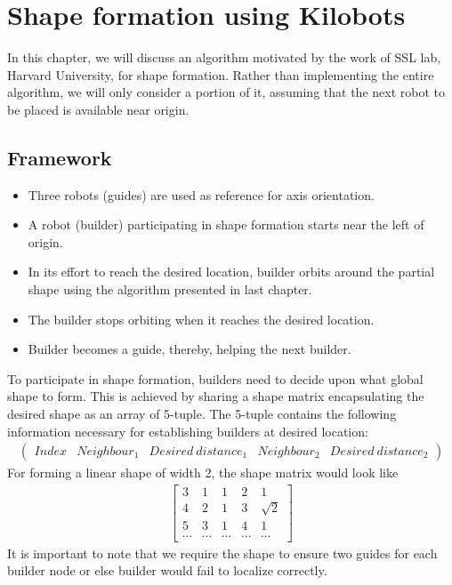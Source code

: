 \documentclass{report}[12pt]
\begin{document}
\chapter{Shape formation using Kilobots}
In this chapter, we will discuss an algorithm motivated by the work \cite{MR-AC-RN:2014} of SSL lab, Harvard University, for shape formation. Rather than implementing the entire algorithm, we will only consider a portion of it, assuming that the next robot to be placed is available near origin.
\section{Framework}
\begin{itemize}
	\item Three robots (guides) are used as reference for axis orientation.
	\item A robot (builder) participating in shape formation starts near the left of origin.
	\item In its effort to reach the desired location, builder orbits around the partial shape using the algorithm presented in last chapter.
	\item The builder stops orbiting when it reaches the desired location.
	\item Builder becomes a guide, thereby, helping the next builder.
\end{itemize}
To participate in shape formation, builders need to decide upon what global shape to form. This is achieved by sharing a shape matrix encapsulating the desired shape as an array of 5-tuple. The 5-tuple contains the following information necessary for establishing builders at desired location:
\begin{align}
	\left(
	\begin{matrix}
	Index & Neighbour_1 & Desired\ distance_1 & Neighbour_2 & Desired\ distance_2 
	\end{matrix}
	\right)
\end{align}
For forming a linear shape of width 2, the shape matrix would look like
\begin{align}
	\label{eq:shape_matrix_linear}
	\begin{bmatrix}
	3      & 1      & 1      & 2      & 1        \\
	4      & 2      & 1      & 3      & \sqrt{2} \\
	5      & 3      & 1      & 4      & 1        \\
	\cdots & \cdots & \cdots & \cdots & \cdots   
	\end{bmatrix}
\end{align}
It is important to note that we require the shape to ensure two guides for each builder node or else builder would fail to localize correctly.
\end{document}
